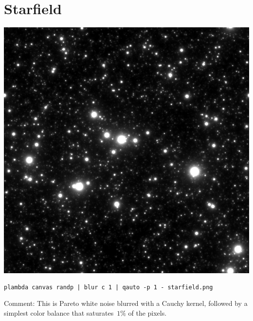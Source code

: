 \section{Starfield}
\includegraphics{starfield.png}
\begin{verbatim}
plambda canvas randp | blur c 1 | qauto -p 1 - starfield.png
\end{verbatim}
Comment: This is Pareto white noise blurred with a Cauchy kernel, followed by
a simplest color balance that saturates~$1\%$ of the pixels.

